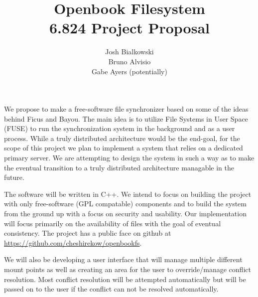 \documentclass{article}
\title
{%
   Openbook Filesystem \\
   \small 6.824 Project Proposal
}
\author
{%
   \small Josh Bialkowski \\
   \small Bruno Alvisio \\
   \small Gabe Ayers (potentially)
}
\begin{document}
\maketitle

We propose to make a free-software file synchronizer based on some of the ideas 
behind Ficus and Bayou. The main idea is to utilize File Systems in User Space
(FUSE) to run the synchronization system in the background and as a user 
process. While a truly distributed architecture would be the end-goal, for the
scope of this project we plan to implement a system that relies on a dedicated
primary server. We are attempting to design the system in such a way as to make
the eventual transition to a truly distributed architecture managable in the
future. 

The software will be written in C++. We intend to focus on building the project
with only free-software (GPL compatable) components and to build the system 
from the ground up with a focus on security and usability. Our implementation 
will focus primarily on the availability of files with the goal of eventual
consistency. The project has a public face on github at 
\url{https://github.com/cheshirekow/openbookfs}.

We will also be developing a user interface that will manage multiple different
mount points as well as creating an area for the user to override/manage conflict
resolution. Most conflict resolution will be attempted automatically but will be
passed on to the user if the conflict can not be resolved automatically.
\end{document}
